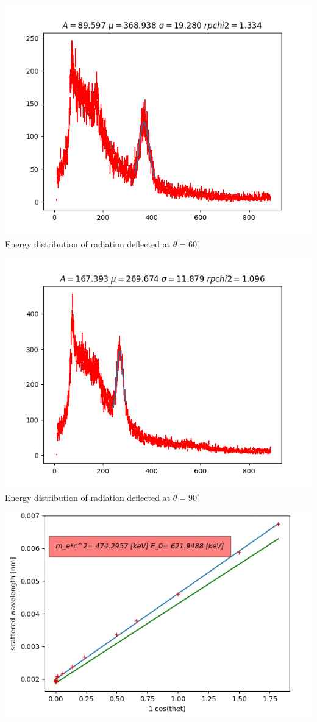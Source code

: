 \documentclass{article}
\begin{document}
\begin{center}
\includegraphics[scale=0.65]{Data/Wavelength_Data/compton_fit_thet_60_fit.png} \\
\caption[3]{ Energy distribution of radiation deflected at $\theta=60^{\circ}$}
\includegraphics[scale=0.65]{Data/Wavelength_Data/compton_fit_thet_90_fit.png} \\
\caption[4]{ Energy distribution of radiation deflected at $\theta=90^{\circ}$}
\includegraphics[scale=0.6]{Data/Analysis/lambda_vs_cos_angle.jpg} \\

\end{center}
\end{document}
